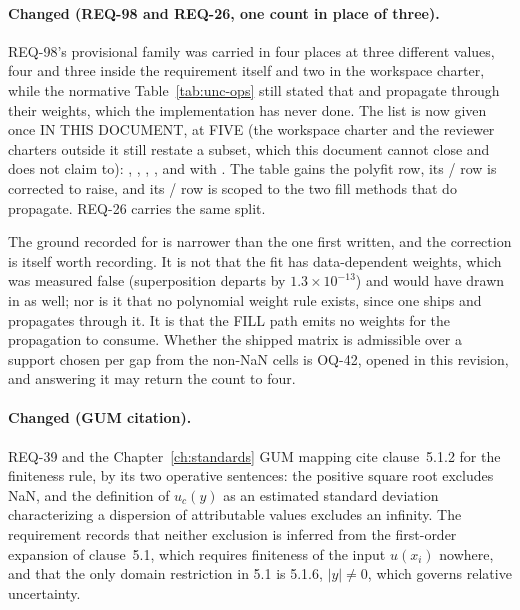 \paragraph{Changed (REQ-98 and REQ-26, one count in place of three).}
REQ-98's provisional family was carried in four places at three
different values, four and three inside the requirement itself and two
in the workspace charter, while the normative
Table~\ref{tab:unc-ops} still stated that  and 
propagate through their weights, which the implementation has never
done. The list is now given once IN THIS DOCUMENT, at FIVE (the
workspace charter and the reviewer charters outside it still restate a
subset, which this document cannot close and does not claim to):
, , , , and
 with . The table gains the
 polyfit row, its / row is corrected
to raise, and its / row is scoped to the
two fill methods that do propagate. REQ-26 carries the same split.

The ground recorded for  is narrower than
the one first written, and the correction is itself worth recording. It
is not that the fit has data-dependent weights, which was measured false
(superposition departs by $1.3 \times 10^{-13}$) and would have drawn
 in as well; nor is it that no polynomial weight rule
exists, since one ships and 
propagates through it. It is that the FILL path emits no weights for the
propagation to consume. Whether the shipped matrix is admissible over a
support chosen per gap from the non-NaN cells is OQ-42, opened in this
revision, and answering it may return the count to four.

\paragraph{Changed (GUM citation).} REQ-39 and the
Chapter~\ref{ch:standards} GUM mapping cite clause~5.1.2 for the
finiteness rule, by its two operative sentences: the positive square
root excludes NaN, and the definition of $u_c(y)$ as an estimated
standard deviation characterizing a dispersion of attributable values
excludes an infinity. The requirement records that neither exclusion is
inferred from the first-order expansion of clause~5.1, which requires
finiteness of the input $u(x_i)$ nowhere, and that the only domain
restriction in 5.1 is 5.1.6, $|y| \neq 0$, which governs relative
uncertainty.

